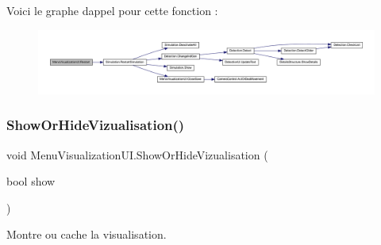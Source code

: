 Voici le graphe d\textquotesingle{}appel pour cette fonction \+:
\nopagebreak
\begin{figure}[H]
\begin{center}
\leavevmode
\includegraphics[width=350pt]{class_menu_visualization_u_i_ad71bfeae87aee9f53387e7abf59040c4_cgraph}
\end{center}
\end{figure}
\mbox{\label{class_menu_visualization_u_i_ab06398a58bc8438ead7172d9e09b8bca}} 
\subsubsection{\texorpdfstring{Show\+Or\+Hide\+Vizualisation()}{ShowOrHideVizualisation()}}
{\footnotesize\ttfamily void Menu\+Visualization\+U\+I.\+Show\+Or\+Hide\+Vizualisation (\begin{DoxyParamCaption}\item[{bool}]{show }\end{DoxyParamCaption})\hspace{0.3cm}{\ttfamily [inline]}}



Montre ou cache la visualisation. 


